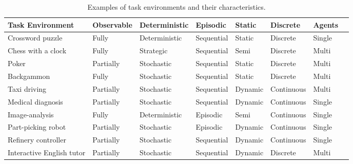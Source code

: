 \documentclass[11pt,oneside,a4paper,openright]{report}
\begin{document}
	\begin{table}[h]
	\centering
	\begin{tabular}{||l|l|l|l|l|l|l|l||}
		\hline
		\hline
		\textbf{Task} \textbf{Environment} & \textbf{Observable} & \textbf{Deterministic} & \textbf{Episodic} & \textbf{Static} & \textbf{Discrete} & \textbf{Agents}\\
		\hline
		Crossword puzzle 	& Fully & Deterministic & Sequential & Static & Discrete & Single	\\ \hline
		Chess with a clock	& Fully & Strategic     & Sequential & Semi   & Discrete & Multi	\\ \hline
		Poker			& Partially & Stochastic & Sequential & Static & Discrete & Multi	\\ \hline
		Backgammon		& Fully & Stochastic    & Sequential & Static & Discrete & Multi	\\ \hline
		Taxi driving		& Partially & Stochastic & Sequential & Dynamic & Continuous & Multi	\\ \hline
		Medical diagnosis	& Partially & Stochastic & Sequential & Dynamic & Continuous & Single	\\ \hline
		Image-analysis		& Fully	& Deterministic & Episodic & Semi & Continuous & Single 	\\ \hline
		Part-picking robot	& Partially & Stochastic & Episodic & Dynamic & Continuous & Single	\\ \hline
		Refinery controller	& Partially & Stochastic & Sequential & Dynamic & Continuous & Single	\\ \hline
		Interactive English tutor & Partially & Stochastic & Sequential & Dynamic & Discrete & Multi	\\ \hline
		\hline
	\end{tabular}
	\caption{Examples of task environments and their characteristics.}
	\label{tab:EvironmentCharactExamples}
	\end{table}



\end{document}
